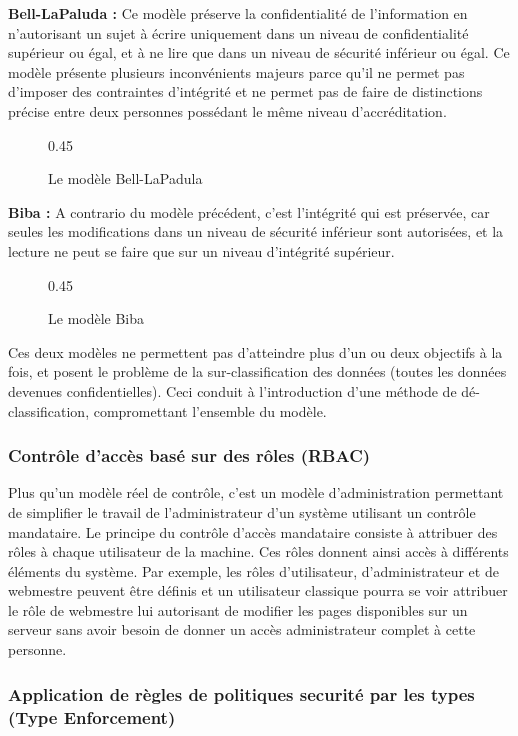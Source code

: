 \textbf{Bell-LaPaluda :} Ce modèle préserve la confidentialité de l'information en n'autorisant un sujet à écrire uniquement dans un niveau de confidentialité supérieur ou égal, et à ne lire que dans un niveau de sécurité inférieur ou égal. Ce modèle présente plusieurs inconvénients majeurs parce qu'il ne permet pas d'imposer des contraintes d'intégrité et ne permet pas de faire de distinctions précise entre deux personnes possédant le même niveau d'accréditation.

\begin{figure}[h]
	\centering
	{0.45}
	\caption{Le modèle Bell-LaPadula}
\end{figure}

\textbf{Biba :} A contrario du modèle précédent, c'est l'intégrité qui est préservée, car seules les modifications dans un niveau de sécurité inférieur sont autorisées, et la lecture ne peut se faire que sur un niveau d'intégrité supérieur.

\begin{figure}[h]
	\centering
	{0.45}
	\caption{Le modèle Biba}
\end{figure}

Ces deux modèles ne permettent pas d'atteindre plus d'un ou deux objectifs à la fois, et posent le problème de la sur-classification des données (toutes les données devenues confidentielles). Ceci conduit à l'introduction d'une méthode de dé-classification, compromettant l'ensemble du modèle.

\subsubsection{Contrôle d'accès basé sur des rôles (RBAC)}

Plus qu'un modèle réel de contrôle, c'est un modèle d'administration permettant de simplifier le travail de l'administrateur d'un système utilisant un contrôle mandataire. Le principe du contrôle d'accès mandataire consiste à attribuer des rôles à chaque utilisateur de la machine. Ces rôles donnent ainsi accès à différents éléments du système. Par exemple, les rôles d'utilisateur, d'administrateur et de webmestre peuvent être définis et un utilisateur classique pourra se voir attribuer le rôle de webmestre lui autorisant de modifier les pages disponibles sur un serveur sans avoir besoin de donner un accès administrateur complet à cette personne.

\subsubsection{Application de règles de politiques securité par les types (Type Enforcement)}

